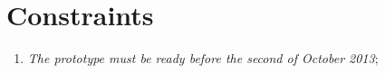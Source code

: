 \section{Constraints}
\thispagestyle{fancy}
\begin{enumerate}
\item \emph{The prototype must be ready before the second of October 2013};
\end{enumerate}